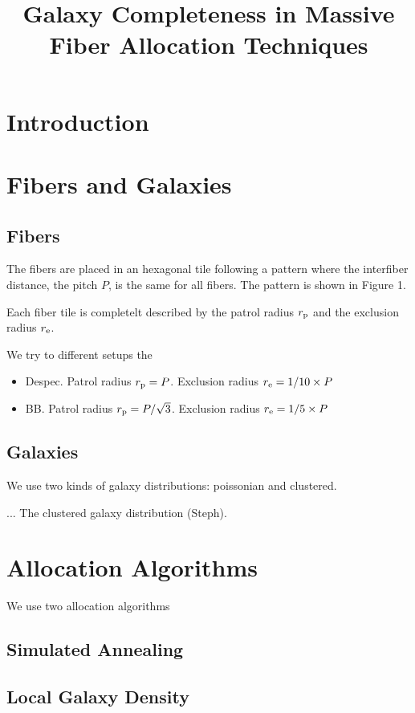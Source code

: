 \documentclass{article}
\title{Galaxy Completeness in Massive Fiber Allocation Techniques}
\begin{document}
\maketitle
\section{Introduction}

\section{Fibers and Galaxies}

\subsection{Fibers}

The fibers are placed in an hexagonal tile following a pattern where
the interfiber distance, the pitch $P$, is the same for all
fibers. The pattern is shown in Figure 1. 

Each fiber tile is completelt described by the patrol radius $r_{\rm
  p}$ and the exclusion radius $r_{\rm e}$.


We try to different setups the 
\begin{itemize}
\item {\rm Despec}. Patrol radius $r_{\rm p}=P$. Exclusion radius
  $r_{\rm e}=1/10\times P$
\item {\rm BB}. Patrol radius $r_{\rm p}=P/\sqrt{3}$. Exclusion radius
  $r_{\rm e}=1/5\times P$
\end{itemize}

\subsection{Galaxies}
We use two kinds of galaxy distributions: poissonian and clustered. 

... The clustered galaxy distribution (Steph).

\section{Allocation Algorithms}

We use two allocation algorithms

\subsection{Simulated Annealing}


\subsection{Local Galaxy Density}
\end{document}
